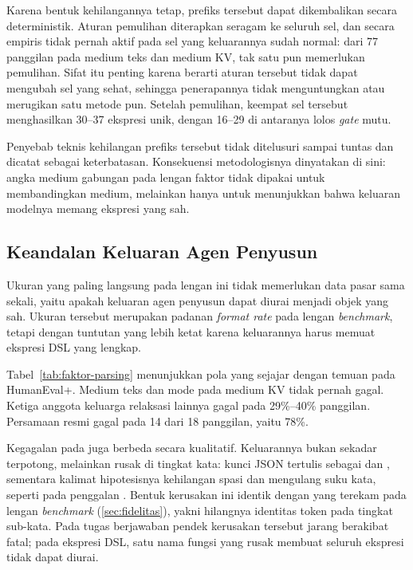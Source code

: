 Karena bentuk kehilangannya tetap, prefiks tersebut dapat dikembalikan secara
deterministik. Aturan pemulihan diterapkan seragam ke seluruh sel, dan secara
empiris tidak pernah aktif pada sel yang keluarannya sudah normal: dari 77
panggilan pada medium teks dan medium KV, tak satu pun memerlukan pemulihan.
Sifat itu penting karena berarti aturan tersebut tidak dapat mengubah sel yang
sehat, sehingga penerapannya tidak menguntungkan atau merugikan satu metode
pun. Setelah pemulihan, keempat sel tersebut menghasilkan 30--37 ekspresi unik,
dengan 16--29 di antaranya lolos \textit{gate} mutu.

Penyebab teknis kehilangan prefiks tersebut tidak ditelusuri sampai tuntas dan
dicatat sebagai keterbatasan. Konsekuensi metodologisnya dinyatakan di sini:
angka medium gabungan pada lengan faktor tidak dipakai untuk membandingkan
medium, melainkan hanya untuk menunjukkan bahwa keluaran modelnya memang
ekspresi yang sah.

\subsection{Keandalan Keluaran Agen Penyusun}

Ukuran yang paling langsung pada lengan ini tidak memerlukan data pasar sama
sekali, yaitu apakah keluaran agen penyusun dapat diurai menjadi objek yang
sah. Ukuran tersebut merupakan padanan \textit{format rate} pada lengan
\textit{benchmark}, tetapi dengan tuntutan yang lebih ketat karena keluarannya
harus memuat ekspresi DSL yang lengkap.



Tabel~\ref{tab:faktor-parsing} menunjukkan pola yang sejajar dengan temuan pada
HumanEval+. Medium teks dan mode  pada medium KV tidak pernah gagal.
Ketiga anggota keluarga relaksasi lainnya gagal pada 29\%--40\% panggilan.
Persamaan resmi  gagal pada 14 dari 18 panggilan, yaitu 78\%.

Kegagalan pada  juga berbeda secara kualitatif. Keluarannya bukan
sekadar terpotong, melainkan rusak di tingkat kata: kunci JSON tertulis sebagai
 dan , sementara kalimat hipotesisnya kehilangan
spasi dan mengulang suku kata, seperti pada penggalan
. Bentuk
kerusakan ini identik dengan yang terekam pada lengan \textit{benchmark}
(\ref{sec:fidelitas}), yakni hilangnya identitas token pada tingkat sub-kata.
Pada tugas berjawaban pendek kerusakan tersebut jarang berakibat fatal; pada
ekspresi DSL, satu nama fungsi yang rusak membuat seluruh ekspresi tidak dapat
diurai.

